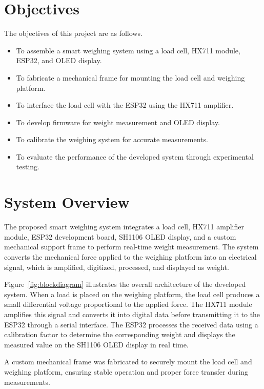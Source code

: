 \section{Objectives}

The objectives of this project are as follows.

\begin{itemize}
\item To assemble a smart weighing system using a load cell, HX711 module, ESP32, and OLED display.
\item To fabricate a mechanical frame for mounting the load cell and weighing platform.
\item To interface the load cell with the ESP32 using the HX711 amplifier.
\item To develop firmware for weight measurement and OLED display.
\item To calibrate the weighing system for accurate measurements.
\item To evaluate the performance of the developed system through experimental testing.
\end{itemize}

\section{System Overview}

The proposed smart weighing system integrates a load cell, HX711 amplifier module, ESP32 development board, SH1106 OLED display, and a custom mechanical support frame to perform real-time weight measurement. The system converts the mechanical force applied to the weighing platform into an electrical signal, which is amplified, digitized, processed, and displayed as weight.

Figure~\ref{fig:blockdiagram} illustrates the overall architecture of the developed system. When a load is placed on the weighing platform, the load cell produces a small differential voltage proportional to the applied force. The HX711 module amplifies this signal and converts it into digital data before transmitting it to the ESP32 through a serial interface. The ESP32 processes the received data using a calibration factor to determine the corresponding weight and displays the measured value on the SH1106 OLED display in real time.

A custom mechanical frame was fabricated to securely mount the load cell and weighing platform, ensuring stable operation and proper force transfer during measurements.

